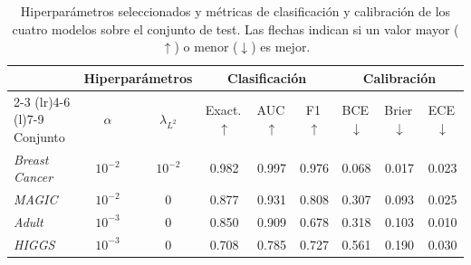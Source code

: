 \begin{table}[htbp]
\centering
\footnotesize
\setlength{\tabcolsep}{3.6pt}
\caption[Rendimiento y calibración de los modelos]{Hiperparámetros seleccionados y
métricas de clasificación y calibración de los cuatro modelos sobre el conjunto de test.
Las flechas indican si un valor mayor ($\uparrow$) o menor ($\downarrow$) es mejor.}
\label{tab:metricasModelos}
\begin{tabular}{@{}l cc ccc ccc@{}}
\toprule
 & \multicolumn{2}{c}{Hiperparámetros}
 & \multicolumn{3}{c}{Clasificación}
 & \multicolumn{3}{c}{Calibración} \\
\cmidrule(lr){2-3} \cmidrule(lr){4-6} \cmidrule(l){7-9}
Conjunto & $\alpha$ & $\lambda_{L^2}$
 & Exact.\,$\uparrow$ & \acs{AUC}\,$\uparrow$ & F1\,$\uparrow$
 & \acs{BCE}\,$\downarrow$ & Brier\,$\downarrow$ & \acs{ECE}\,$\downarrow$ \\
\midrule
\textit{Breast Cancer} & $10^{-2}$ & $10^{-2}$ & 0.982 & 0.997 & 0.976 & 0.068 & 0.017 & 0.023 \\
\textit{MAGIC} & $10^{-2}$ & $0$ & 0.877 & 0.931 & 0.808 & 0.307 & 0.093 & 0.025 \\
\textit{Adult} & $10^{-3}$ & $0$ & 0.850 & 0.909 & 0.678 & 0.318 & 0.103 & 0.010 \\
\textit{HIGGS} & $10^{-3}$ & $0$ & 0.708 & 0.785 & 0.727 & 0.561 & 0.190 & 0.030 \\
\bottomrule
\end{tabular}
\end{table}
